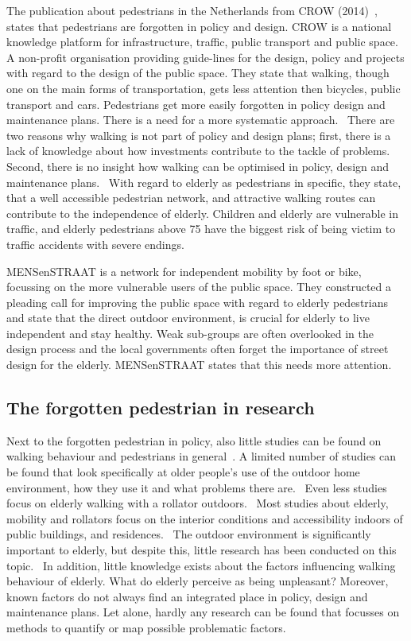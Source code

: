 The publication about pedestrians in the Netherlands from CROW (2014)~\cite{Crow2014}, states that pedestrians are forgotten in policy and design. CROW is a national knowledge platform for infrastructure, traffic, public transport and public space. A non-profit organisation providing guide-lines for the design, policy and projects with regard to the design of the public space. They state that walking, though one on the main forms of transportation, gets less attention then bicycles, public transport and cars. Pedestrians get more easily forgotten in policy design and maintenance plans. There is a need for a more systematic approach.~\cite{Crow2014} There are two reasons why walking is not part of policy and design plans; first, there is a lack of knowledge about how investments contribute to the tackle of problems. Second, there is no insight how walking can be optimised in policy, design and maintenance plans.~\cite{Crow2014}
With regard to elderly as pedestrians in specific, they state, that a well accessible pedestrian network, and attractive walking routes can contribute to the independence of elderly. Children and elderly are vulnerable in traffic, and elderly pedestrians above 75 have the biggest risk of being victim to traffic accidents with severe endings.~\cite{Crow2014}

MENSenSTRAAT is a network for independent mobility by foot or bike, focussing on the more vulnerable users of the public space. They constructed a pleading call for improving the public space with regard to elderly pedestrians and state that the direct outdoor environment, is crucial for elderly to live independent and stay healthy. Weak sub-groups are often overlooked in the design process and the local governments often forget the importance of street design for the elderly. MENSenSTRAAT states that this needs more attention.~\cite{MENSenSTRAAT2014} 

\subsection{The forgotten pedestrian in research}
Next to the forgotten pedestrian in policy, also little studies can be found on walking behaviour and pedestrians in general~\cite{Vine2012}. A limited number of studies can be found that look specifically at older people's use of the outdoor home environment, how they use it and what problems there are.~\cite{Phillips2013, Stahl2008} Even less studies focus on elderly walking with a rollator outdoors.~\cite{Stahl2008, Stahl2013, Phillips2013} Most studies about elderly, mobility and rollators focus on the interior conditions and accessibility indoors of public buildings, and residences.~\cite{Crow2014, Sauter2010, Verschuur2013} The outdoor environment is significantly important to elderly, but despite this, little research has been conducted on this topic.~\cite{Stahl2008} In addition, little knowledge exists about the factors influencing walking behaviour of elderly. What do elderly perceive as being unpleasant? Moreover, known factors do not always find an integrated place in policy, design and maintenance plans. Let alone, hardly any research can be found that focusses on methods to quantify or map possible problematic factors. 

